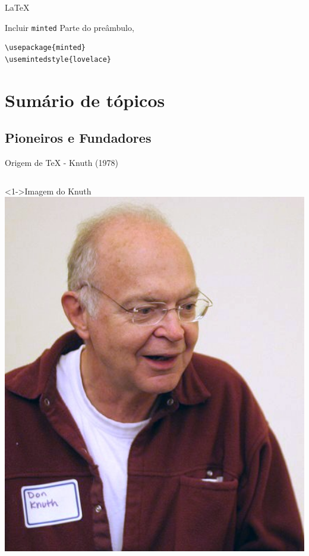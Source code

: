 \documentclass[bigger]{beamer}
\begin{document}
{\begin{frame}[label={sec:org2dea1b1},fragile]{\LaTeX{}}
 \begin{block}{Incluir \texttt{minted}}
Parte do preâmbulo,
\begin{verbatim}
\usepackage{minted}
\usemintedstyle{lovelace}
\end{verbatim}
\end{block}
\end{frame}
\section{Sumário de tópicos}
\label{sec:org59220ec}
\subsection{Pioneiros e Fundadores}
\label{sec:orge3faee7}
\begin{frame}[label={sec:org5c6695b},fragile]{Origem de \TeX{} - Knuth (1978)}
 \begin{columns}
\begin{column}{0.48\columnwidth}
\begin{block}<1->{Imagem do Knuth}
\href{img/KnuthAtOpenContentAlliance.jpg}{\includegraphics[width=1.02\textwidth]{./img/KnuthAtOpenContentAlliance.jpg}}

\end{block}
\end{column}
\end{columns}
\end{frame}}
\end{document}
